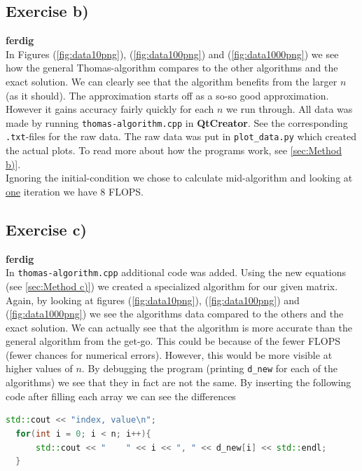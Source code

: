 \documentclass{article}
\begin{document}
  \subsection{Exercise b)} \label{sec:Results b)}

    {\bf ferdig} \\

    In Figures (\ref{fig:data10png}), (\ref{fig:data100png}) and (\ref{fig:data1000png}) we see how the general Thomas-algorithm compares to the other algorithms and the exact solution. We can clearly see that the algorithm benefits from the larger $n$ (as it should). The approximation starts off as a so-so good approximation. However it gains accuracy fairly quickly for each $n$ we run through. All data was made by running \texttt{thomas-algorithm.cpp} in \textbf{QtCreator}. See the corresponding \texttt{.txt}-files for the raw data. The raw data was put in \texttt{plot\_data.py} which created the actual plots. To read more about how the programs work, see
    \ref{sec:Method b)}.\\

    Ignoring the initial-condition we chose to calculate mid-algorithm and looking at \underline{one} iteration we have 8 FLOPS.

  \subsection{Exercise c)} \label{sec:Results c)}

    {\bf ferdig} \\

    In \texttt{thomas-algorithm.cpp} additional code was added. Using the new equations (see \ref{sec:Method c)}) we created a specialized algorithm for our given matrix. Again, by looking at figures (\ref{fig:data10png}), (\ref{fig:data100png}) and (\ref{fig:data1000png}) we see the algorithms data compared to the others and the exact solution. We can actually see that the algorithm is more accurate than the general algorithm from the get-go. This could be because of the fewer FLOPS (fewer chances for numerical errors). However, this would be more visible at higher values of $n$. By debugging the program (printing \texttt{d\_new} for each of the algorithms) we see that they in fact are not the same. By inserting the following code after filling each array we can see the differences \\

  \begin{lstlisting}[language=C++]
    std::cout << "index, value\n";
  for(int i = 0; i < n; i++){
      std::cout << "    " << i << ", " << d_new[i] << std::endl;
  }
  \end{lstlisting}
\end{document}
